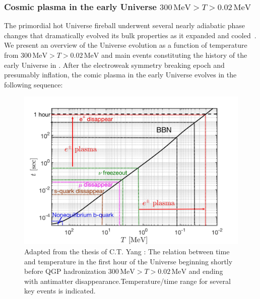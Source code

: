 \subsubsection{Cosmic plasma in the early Universe $300\,\mathrm{MeV}>T>0.02\,\mathrm{MeV}$}
\label{ssec:plasmas}

The primordial hot Universe fireball underwent several nearly adiabatic phase changes that dramatically evolved its bulk properties as it expanded and cooled~\cite{Rafelski:2023emw}. 
We present an overview of the Universe evolution as a function of temperature from $300\,\mathrm{MeV}>T>0.02\,\mathrm{MeV}$ and main events constituting the history of the early Universe in . After the electroweak symmetry breaking epoch and presumably inflation, the comic plasma in the early Universe evolves in the following sequence:

\begin{figure}[ht]
 \centerline{\includegraphics[width=\textwidth,width=\linewidth]{./plots/CosmicTimeTemperature_Project}}
 \caption{Adapted from the thesis of C.T. Yang \cite{Yang:2024ret}:
 The relation between time and temperature in the first hour of the Universe beginning shortly before QGP hadronization $300\,\mathrm{MeV}>T>0.02\,\mathrm{MeV} $ and ending with antimatter disappearance.Temperature/time range for several key events is indicated.}
 \label{Fig:Overview}
\end{figure}
 
